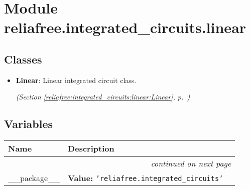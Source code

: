 %
%
%


\section{Module reliafree.integrated\_circuits.linear}

    \label{reliafree:integrated_circuits:linear}


\subsection{Classes}

\begin{itemize}  \setlength{\parskip}{0ex}
  \item \textbf{Linear}: Linear integrated circuit class.



  \textit{(Section \ref{reliafree:integrated_circuits:linear:Linear}, p.~\pageref{reliafree:integrated_circuits:linear:Linear})}

\end{itemize}


  \subsection{Variables}

    \vspace{-1cm}
\hspace{\varindent}\begin{longtable}{|p{\varnamewidth}|p{\vardescrwidth}|l}
\cline{1-2}
\cline{1-2} \centering \textbf{Name} & \centering \textbf{Description}& \\
\cline{1-2}
\endhead\cline{1-2}\multicolumn{3}{r}{\small\textit{continued on next page}}\\\endfoot\cline{1-2}
\endlastfoot\raggedright \_\-\_\-p\-a\-c\-k\-a\-g\-e\-\_\-\_\- & \raggedright \textbf{Value:} 
{\tt \texttt{'}\texttt{reliafree.integrated\_circuits}\texttt{'}}&\\
\cline{1-2}
\end{longtable}

